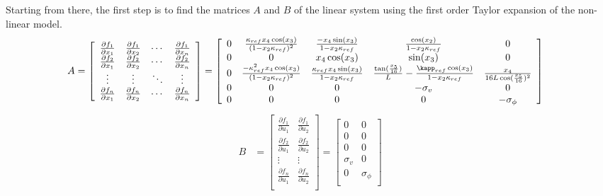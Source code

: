 Starting from there, the first step is to find the matrices $A$ and $B$ of the linear system using the first order Taylor expansion of the non-linear model.
\begin{align}
    A &= 
    \left[ {\begin{array}{cccc}
        \frac{\partial f_1}{\partial x_1} & \frac{\partial f_1}{\partial x_2} & \cdots & \frac{\partial f_1}{\partial x_n}\\
        \frac{\partial f_2}{\partial x_1} & \frac{\partial f_2}{\partial x_2} & \cdots & \frac{\partial f_2}{\partial x_n}\\
        \vdots & \vdots & \ddots & \vdots\\
        \frac{\partial f_n}{\partial x_1} & \frac{\partial f_n}{\partial x_2} & \cdots & \frac{\partial f_n}{\partial x_n}\\
    \end{array} } \right] = 
    \left[ {\begin{array}{ccccc}
        0 &\frac{\kappa_{ref} x_4 \cos(x_3)}{(1 -x_2\kappa_{ref})^2} &\frac{-x_4 \sin(x_3)}{1-x_2\kappa_{ref}} &\frac{\cos(x_2)}{1 - x_2 \kappa_{ref}} &0 \\
        0 &0 &x_4 \cos(x_3) &\sin(x_3) &0\\
        0 &\frac{-\kappa_{ref}^2 x_4 \cos(x_3)}{(1 - x_2\kappa_{ref})^2} &\frac{\kappa_{ref}x_4 \sin(x_3)}{1 - x_2\kappa_{ref}} &\frac{\tan(\frac{x_5}{16})}{L} - \frac{\kapp_{ref} \cos(x_3)}{1 - x_2 \kappa_{ref}} & \frac{x_4}{16 L\cos(\frac{x_5}{16})^2}\\
        0 &0 &0 &-\sigma_v &0\\
        0 &0 &0 &0 &-\sigma_{\phi}
    \end{array} } \right]
\end{align}
\begin{align}
    B &= 
    \left[ {\begin{array}{cc}
        \frac{\partial f_1}{\partial u_1} & \frac{\partial f_1}{\partial u_2}\\
        \frac{\partial f_2}{\partial u_1} & \frac{\partial f_2}{\partial u_2}\\
        \vdots & \vdots \\
        \frac{\partial f_n}{\partial u_1} & \frac{\partial f_n}{\partial u_2}\\
    \end{array} } \right]
    = 
    \left[ {\begin{array}{cc}
        0 &0\\
        0 &0\\
        0 &0\\
        \sigma_v &0\\
        0 &\sigma_{\phi}\\
    \end{array} } \right]
\end{align}


